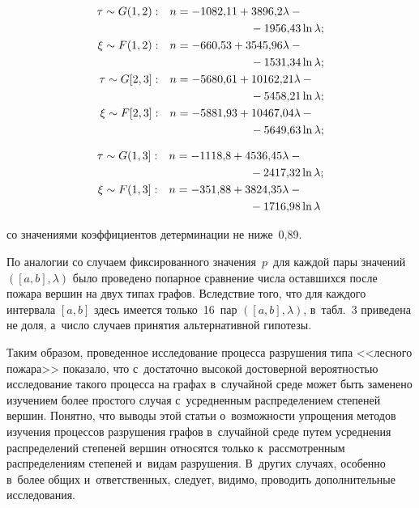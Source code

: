 \begin{multicols}{2}
\noindent
\begin{align*}
\tau\sim {G}(1,2):\quad & n = -1082{,}11+3896{,}2\lambda-{}\\
&\hspace*{25mm}{}-1956{,}43\ln\lambda;\\
\xi\sim F(1,2):\quad & n = -660{,}53+3545{,}96\lambda-{}\\
&\hspace*{25mm}{}-1531{,}34\ln\lambda;\\
\tau\sim {G}[2,3]:\quad & n = -5680{,}61+10162{,}21\lambda-{}\\
&\hspace*{25mm}{}-5458{,}21\ln\lambda;\\
\xi\sim F[2,3]:\quad & n = -5881{,}93+10467{,}04\lambda-{}\\
&\hspace*{25mm}{}-5649{,}63\ln\lambda;
\end{align*}

\noindent
\begin{align*}
\tau\sim {G}(1,3]:\quad & n = -1118{,}8+4536{,}45\lambda-{}\\
&\hspace*{25mm}{}-2417{,}32\ln\lambda;\\
\xi\sim F(1,3]:\quad & n = -351{,}88+3824{,}35\lambda-{}\\
&\hspace*{25mm}{}-1716{,}98\ln\lambda
\end{align*}

\vspace*{-6pt}

\noindent
со значениями коэффициентов детерминации не ниже~0,89.

По аналогии со случаем фиксированного значения~$p$~для каж\-дой пары значений
$([a,b],\lambda)$ было проведено попарное сравнение чис\-ла оставшихся после 
пожара вершин
на двух типах графов. Вследствие того, что для каждого интервала $[a,b]$ здесь 
имеется
только~16~пар $([a,b],\lambda)$, в~табл.~3 приведена не доля, а~чис\-ло случаев
принятия альтернативной гипотезы.



Таким образом, проведенное исследование процесса разрушения типа <<лес\-но\-го пожара>>
показало, что с~до\-ста\-точ\-но высокой до\-сто\-вер\-ной ве\-ро\-ят\-ностью исследование такого процесса
на графах в~случайной среде может быть заменено изучением более прос\-то\-го случая 
с~усредненным распределением степеней вершин. Понятно, что выводы этой статьи 
о~воз\-мож\-ности
упрощения методов изучения процессов разрушения графов в~случайной среде путем усреднения
распределений степеней вершин относятся только к~рас\-смот\-рен\-ным распределениям степеней 
и~видам разрушения. В~других случаях, особенно в~более общих и~ответственных, следует,
видимо, проводить дополнительные исследования.


\end{multicols}
